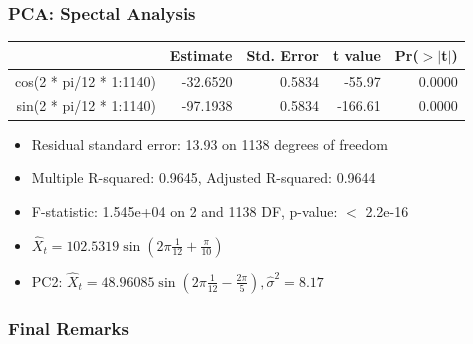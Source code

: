 \documentclass{beamer}
\begin{document}
\begin{frame}
\frametitle{PCA: Spectal Analysis}
\begin{table}[ht]
\centering
\begin{tabular}{rrrrr}
\hline
& Estimate & Std. Error & t value & Pr($>$$|$t$|$) \\ 
\hline
cos(2 * pi/12 * 1:1140) & -32.6520 & 0.5834 & -55.97 & 0.0000 \\ 
sin(2 * pi/12 * 1:1140) & -97.1938 & 0.5834 & -166.61 & 0.0000 \\ 
\hline
\end{tabular}
\end{table}
\begin{itemize}
\item Residual standard error: 13.93 on 1138 degrees of freedom
\item Multiple R-squared:  0.9645,	Adjusted R-squared:  0.9644 
\item F-statistic: 1.545e+04 on 2 and 1138 DF,  p-value: $<$ 2.2e-16
\item $\hat{X}_t = 102.5319\sin(2\pi\frac{1}{12} + \frac{\pi}{10})$ %
\item PC2: $\hat{X}_t = 48.96085\sin(2\pi\frac{1}{12}-\frac{2\pi}{5} ), \hat{\sigma}^2 = 8.17$ %
\end{itemize}
\end{frame}

\begin{frame}
\frametitle{Final Remarks}
\end{frame}
\end{document}
